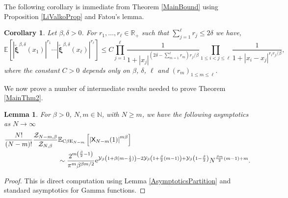 \documentclass[]{article}
\newtheorem{cor}[thm]{Corollary}
\newtheorem{lem}[thm]{Lemma}
\begin{document}
The following corollary is immediate from Theorem \ref{MainBound} using Proposition \ref{LiValkoProp} and Fatou's lemma.

\begin{cor}\label{BoundLimitingEntire}
Let $\beta,\delta>0$. For $r_1,\dots,r_\ell \in \mathbb{R}_+$ such that $\sum_{j=1}^\ell r_j \le2\delta$ we have,
\begin{equation}
\mathbb{E}\left[\left|\tilde{\boldsymbol{\xi}}^{\beta,\delta}(x_1)\right|^{r_1}\cdots \left|\tilde{\boldsymbol{\xi}}^{\beta,\delta}(x_\ell)\right|^{r_\ell}\right] \le C \prod_{j=1}^\ell \frac{1}{1+|x_j|^{(2\delta-\sum_{m=1}^\ell r_m)r_j/\beta}} \prod_{1\le i < j\le \ell} \frac{1}{1+|x_i-x_j|^{r_ir_j/\beta}},
\end{equation}
 where the constant $C > 0$ depends only on 
$\beta$, $\delta$, $\ell$ and $(r_m)_{1 \leq m \leq \ell}$. 
\end{cor}


We now prove a number of intermediate results needed to prove Theorem \ref{MainThm2}.


\begin{lem}\label{NormCorrAsymptotics}
For $\beta>0$, $N, m\in \mathbb{N}$, with $N\ge m$, we have the following asymptotics as $N \to \infty$
\begin{align*}
 \frac{N!}{(N-m)!}\frac{\mathcal{Z}_{N-m,\beta}}{\mathcal{Z}_{N,\beta}}&\mathbb{E}_{\textnormal{C}\beta \textnormal{E}_{N-m}}\left[\left|\mathsf{X}_{N-m}(1)\right|^{m\beta}\right]\\&\sim \frac{2^{m\left(\frac{\beta}{2}-1\right)}}{\pi^m\beta^{\beta m/2}} \mathrm{e}^{\mathcal{Y}_\beta\left(1+\beta(m-\frac{1}{2})\right)-2\mathcal{Y}_\beta\left(1+\frac{\beta}{2}(m-1)\right)+\mathcal{Y}_\beta\left(1-\frac{\beta}{2}\right)} N^{\frac{\beta m}{2}(m-1)+m}.
\end{align*}
\end{lem}
\begin{proof}
This is direct computation using Lemma \ref{AsymptoticsPartition} and standard asymptotics for Gamma functions.
\end{proof}
\end{document}
